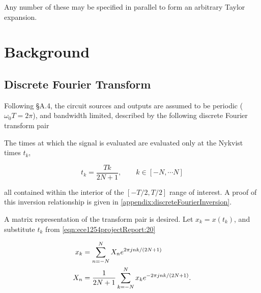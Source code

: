 \documentclass[12pt,journal,compsoc]{../ieeepaper/IEEEtran}
\begin{document}
Any number of these may be specified in parallel to form an arbitrary Taylor expansion.

\section{Background}
\subsection{Discrete Fourier Transform}

Following \citep{giannini2004NonlinearMicrowaveCircuitDesign} \S A.4, the circuit sources and outputs are assumed to be periodic (\( \omega_0 T = 2 \pi \)), and bandwidth limited, described by the following discrete Fourier transform pair


The times at which the signal is evaluated are evaluated only at the Nykvist times 
\( t_k \), 

\begin{equation}\label{eqn:ece1254projectReport:20}
t_k = \frac{T k}{2 N + 1}, \qquad k \in [-N, \cdots N]
\end{equation}

all contained within the interior of the \( [-T/2, T/2] \) range of interest.  
A proof of this inversion relationship is given in \cref{appendix:discreteFourierInversion}.

A matrix representation of the transform pair is desired.  
Let \( x_k = x(t_k) \), and 
substitute \( t_k \) from \cref{eqn:ece1254projectReport:20}

\begin{equation}\label{eqn:ece1254projectReport:140}
\begin{aligned}
x_k &= \sum_{n = -N}^N X_n e^{ 2 \pi j n k /(2 N + 1)} \\
X_n &= \inv{2 N + 1} \sum_{k = -N}^N x_k e^{- 2 \pi j n k /(2 N + 1)}.
\end{aligned}
\end{equation}
\end{document}
